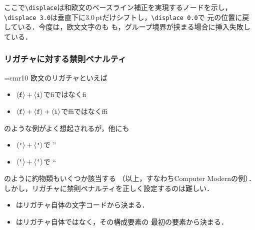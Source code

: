 \documentclass[paper=a4,twocolumn,line_length=24zw,number_of_lines=43]{jlreq}
\begin{document}
ここで\verb+\displace+は和欧文のベースライン補正を実現するノードを示し，
\verb+\displace 3.0+は垂直下に3.0\,ptだけシフトし，\verb+\displace 0.0+で
元の位置に戻している．今度は，欧文文字のも
も，グループ境界が挟まる場合に挿入失敗している\cite{build85}．

\subsubsection{リガチャに対する禁則ペナルティ}

\font\Q=cmr10
欧文のリガチャといえば
\begin{itemize}
  \item $\langle\mbox{\texttt{f}}\rangle+\langle\mbox{\texttt{i}}\rangle$で{\Q f{}iではなくfi}
  \item $\langle\mbox{\texttt{f}}\rangle+\langle\mbox{\texttt{f}}\rangle+\langle\mbox{\texttt{i}}\rangle$で{\Q f{}f{}iではなくffi}
\end{itemize}
のような例がよく想起されるが，他にも
\begin{itemize}
  \item $\langle\mbox{\texttt{'}}\rangle+\langle\mbox{\texttt{'}}\rangle$で {\Q ''}
  \item $\langle\mbox{\texttt{`}}\rangle+\langle\mbox{\texttt{`}}\rangle$で {\Q ``}
\end{itemize}
のように約物類もいくつか該当する
（以上，\code{\fontname\Q}すなわちComputer Modernの例）．
しかし，リガチャに禁則ペナルティを正しく設定するのは難しい．
\begin{itemize}
  \item {}はリガチャ自体の文字コードから決まる．
  \item {}はリガチャ自体ではなく，その構成要素の
    最初の要素から決まる．
\end{itemize}
\end{document}
